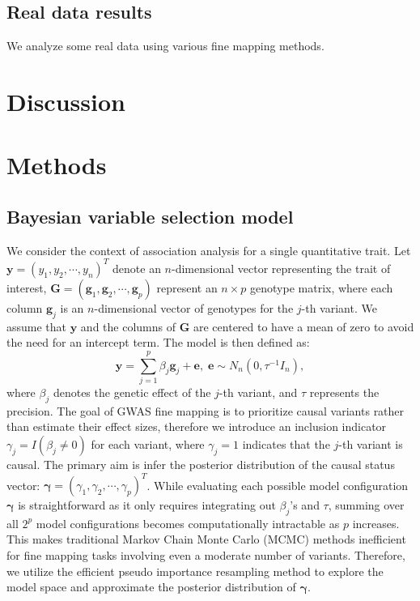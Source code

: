 \documentclass[pdflatex,sn-mathphys-num]{sn-jnl}%
\theoremstyle{thmstyleone}%
\theoremstyle{thmstyletwo}%
\theoremstyle{thmstylethree}%
\begin{document}
\subsection{Real data results}\label{subsec4}
We analyze some real data using various fine mapping methods.

\section{Discussion}\label{sec3}



\newpage
\section{Methods}\label{sec4}
\subsection{Bayesian variable selection model}
We consider the context of association analysis for a single quantitative trait. Let $\mathbf{y}=\left(y_1,y_2,\cdots,y_n\right)^T$ denote an $n$-dimensional vector representing the trait of interest, $\mathbf{G} = \left(\mathbf{g}_1,\mathbf{g}_2,\cdots,\mathbf{g}_p\right)$ represent an $n \times p$ genotype matrix, where each column $\mathbf{g}_j$ is an $n$-dimensional vector of genotypes for the $j$-th variant. We assume that $\mathbf{y}$ and the columns of $\mathbf{G}$ are centered to have a mean of zero to avoid the need for an intercept term. The model is then defined as:
\begin{equation}
    \mathbf{y} = \sum_{j=1}^{p} \beta_j \mathbf{g}_j  + \mathbf{e}, \; \mathbf{e} \sim N_n\left(0, \tau^{-1}I_n\right),
\end{equation}
where $\beta_j$ denotes the genetic effect of the $j$-th variant, and $\tau$ represents the precision. The goal of GWAS fine mapping is to prioritize causal variants rather than estimate their effect sizes, therefore we introduce an inclusion indicator $\gamma_j = I(\beta_j \neq 0)$ for each variant, where $\gamma_j=1$ indicates that the $j$-th variant is causal. The primary aim is infer the posterior distribution of the causal status vector: $\boldsymbol{\gamma} = \left(\gamma_1,\gamma_2,\cdots,\gamma_p\right)^T$. While evaluating each possible model configuration $\boldsymbol{\gamma}$ is straightforward as it only requires integrating out $\beta_j$'s and $\tau$, summing over all $2^p$ model configurations becomes computationally intractable as $p$ increases. This makes traditional Markov Chain Monte Carlo (MCMC) methods inefficient for fine mapping tasks involving even a moderate number of variants. Therefore, we utilize the efficient pseudo importance resampling method to explore the model space and approximate the posterior distribution of $\boldsymbol{\gamma}$.
\end{document}
